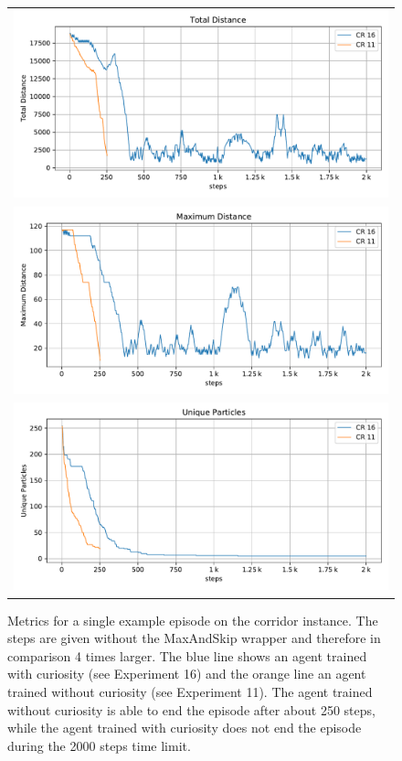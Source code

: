 \begin{figure}[htp]
    \begin{center}
        \begin{tabular}{c}
            \includegraphics[clip, width=0.75\columnwidth]{figures/evaluation/rewards/episode_analysis/curiosity_total_distance.pdf} \\
            \includegraphics[clip, width=0.75\columnwidth]{figures/evaluation/rewards/episode_analysis/curiosity_max_distance.pdf} \\
            \includegraphics[clip, width=0.75\columnwidth]{figures/evaluation/rewards/episode_analysis/curiosity_unique_particles.pdf} \\
        \end{tabular}
    \end{center}
    \caption[Episode metrics on the Corridor Environment]{Metrics for a single example episode on the corridor instance. The steps are given without the MaxAndSkip wrapper and therefore in comparison 4 times larger. The blue line shows an agent trained with curiosity (see Experiment 16) and the orange line an agent trained without curiosity (see Experiment 11). The agent trained without curiosity is able to end the episode after about 250 steps, while the agent trained with curiosity does not end the episode during the 2000 steps time limit.} \label{fig:curiosity_ep_analysis}
\end{figure}



